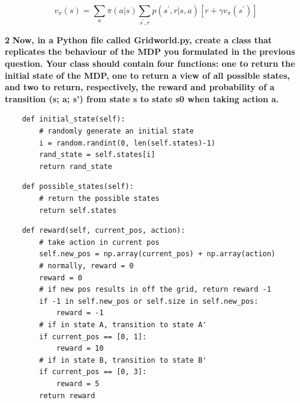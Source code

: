 \documentclass[11pt]{article}
\begin{document}
\begin{equation}
v_{\pi}(s)=\sum_{a} \pi(a | s) \sum_{s^{\prime}, r} p\left(s^{\prime}, r | s, a\right)\left[r+\gamma v_{\pi}\left(s^{\prime}\right)\right]
\end{equation}


\newpage
\noindent
\textbf{2}
\noindent
\textbf{Now, in a Python file called Gridworld.py, create a class that replicates
the behaviour of the MDP you formulated in the previous question. Your class
should contain four functions: one to return the initial state of the MDP, one to
return a view of all possible states, and two to return, respectively, the reward and
probability of a transition (s; a; s') from state s to state s0 when taking action a.}
\\

\lstset{language=Python}
\lstset{frame=lines}
\lstset{basicstyle=\footnotesize}
\begin{lstlisting}
    def initial_state(self):
        # randomly generate an initial state
        i = random.randint(0, len(self.states)-1)
        rand_state = self.states[i]
        return rand_state
\end{lstlisting}

\lstset{basicstyle=\footnotesize}
\begin{lstlisting}
    def possible_states(self):
        # return the possible states
        return self.states
\end{lstlisting}

\lstset{basicstyle=\footnotesize}
\begin{lstlisting}
    def reward(self, current_pos, action):
        # take action in current pos
        self.new_pos = np.array(current_pos) + np.array(action)
        # normally, reward = 0
        reward = 0
        # if new pos results in off the grid, return reward -1
        if -1 in self.new_pos or self.size in self.new_pos:
            reward = -1
        # if in state A, transition to state A'
        if current_pos == [0, 1]:
            reward = 10
        # if in state B, transition to state B'
        if current_pos == [0, 3]:
            reward = 5
        return reward
\end{lstlisting}


\end{document}
